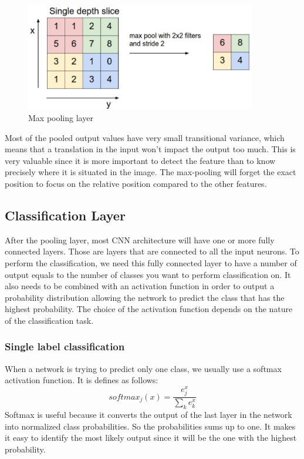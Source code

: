 	\begin{figure}[!htp]
    \centering
        \includegraphics[width=0.9\textwidth]{./figures/02-maxpool}
        \caption{Max pooling layer}\label{fig:maxpool}
    \end{figure}
 
   
Most of the pooled output values have very small transitional variance, which means that a translation in the input won't impact the output too much. This is very valuable since it is more important to detect the feature than to know precisely where it is situated in the image. The max-pooling will forget the exact position to focus on the relative position compared to the other features.

\subsection{Classification Layer}
\label{sec:class_lay}
After the pooling layer, most CNN architecture will have one or more fully connected layers. Those are layers that are connected to all the input neurons. To perform the classification, we need this fully connected layer to have a number of output equals to the number of classes you want to perform classification on. It also needs to be combined with an activation function in order to output a probability distribution allowing the network to predict the class that has the highest probability. The choice of the activation function depends on the nature of the classification task.
\subsubsection{Single label classification}
When a network is trying to predict only one class, we usually use a softmax activation function. It is defines as follows: \[softmax_j(x) = \frac{e^x_j}{\sum\nolimits_{k} e^x_k} \]Softmax is useful because it converts the output of the last layer in the network into normalized class probabilities. So the probabilities sums up to one. It makes it easy to identify the most likely output since it will be the one with the highest probability. 
